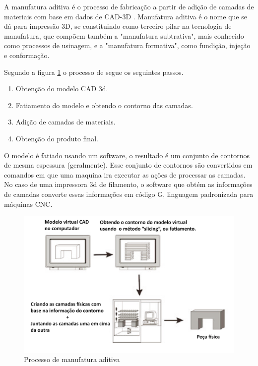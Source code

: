 A manufatura aditiva é o processo de fabricação a partir de adição de camadas de materiais com base em dados de CAD-3D \cite{manufatura_aditiva}.
Manufatura aditiva é o nome que se dá para impressão 3D, se constituindo como terceiro pilar na tecnologia de manufatura, que compõem também a "manufatura subtrativa",
mais conhecido como processos de usinagem, e a "manufatura formativa", como fundição, injeção e conformação.

Segundo a figura \ref{fig:manufatura_aditiva} o processo de segue os seguintes passos.

\begin{enumerate}
	\item Obtenção do modelo CAD 3d.
	\item Fatiamento do modelo e obtendo o contorno das camadas.
	\item Adição de camadas de materiais.
	\item Obtenção do produto final.
\end{enumerate}

O modelo é fatiado usando um software, o resultado é um conjunto de contornos de mesma espessura (geralmente).
Esse conjunto de contornos são convertidos em comandos em que uma maquina ira executar as ações de processar as camadas.
No caso de uma impressora 3d de filamento, o software que obtém as informações de camadas converte essas informações em código G, linguagem padronizada para máquinas CNC.

\begin{figure}[h]
	\centering
	\includegraphics[width=1\textwidth]{figures/manufatura_aditiva}
	\caption{Processo de manufatura aditiva \cite{manufatura_aditiva}}
	\label{fig:manufatura_aditiva}
\end{figure}
